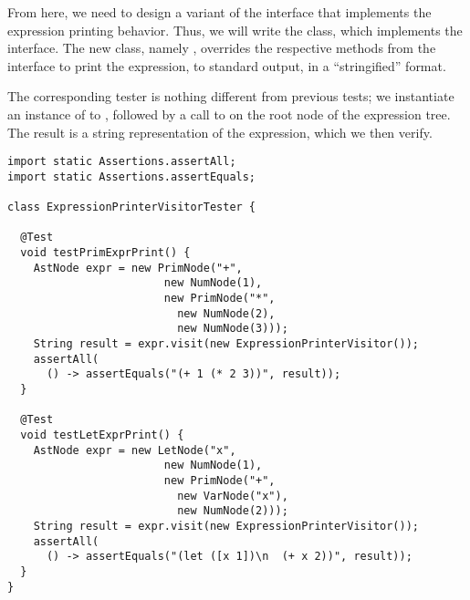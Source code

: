 From here, we need to design a variant of the interface that implements the expression printing behavior. 
Thus, we will write the  class, which implements the  interface. 
The new class, namely , overrides the respective methods from the  interface to print the expression, to standard output, in a ``stringified'' format.

The corresponding tester is nothing different from previous tests; we instantiate an instance of  to , followed by a call to  on the root node of the expression tree. 
The result is a string representation of the expression, which we then verify.

\newpage
\begin{lstlisting}[language=MyJava]
import static Assertions.assertAll;
import static Assertions.assertEquals;

class ExpressionPrinterVisitorTester {

  @Test
  void testPrimExprPrint() {
    AstNode expr = new PrimNode("+", 
                        new NumNode(1), 
                        new PrimNode("*", 
                          new NumNode(2), 
                          new NumNode(3)));
    String result = expr.visit(new ExpressionPrinterVisitor());
    assertAll(
      () -> assertEquals("(+ 1 (* 2 3))", result));
  }

  @Test
  void testLetExprPrint() {
    AstNode expr = new LetNode("x", 
                        new NumNode(1), 
                        new PrimNode("+", 
                          new VarNode("x"), 
                          new NumNode(2)));
    String result = expr.visit(new ExpressionPrinterVisitor());
    assertAll(
      () -> assertEquals("(let ([x 1])\n  (+ x 2))", result));
  }
}
\end{lstlisting}

